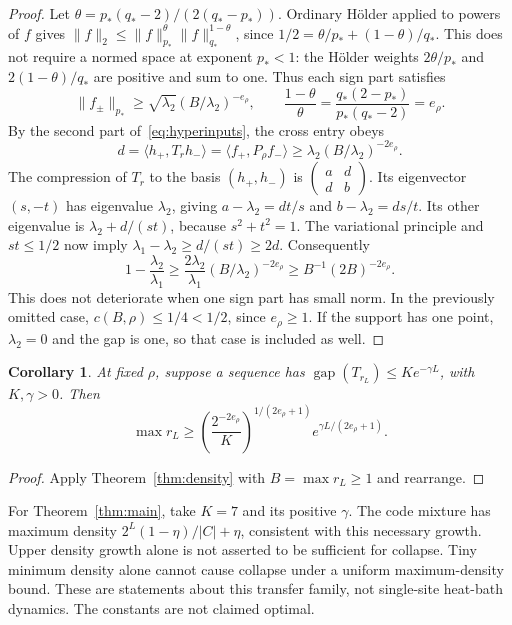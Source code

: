 \documentclass[11pt]{article}
\newtheorem{corollary}[theorem]{Corollary}
\newcommand{\gap}{\operatorname{gap}}
\begin{document}
\begin{proof}
Let $\theta=p_*(q_*-2)/(2(q_*-p_*))$. Ordinary H\"older applied to
powers of $f$ gives
$\|f\|_2\le\|f\|_{p_*}^{\theta}\|f\|_{q_*}^{1-\theta}$,
since $1/2=\theta/p_*+(1-\theta)/q_*$. This does not require a normed
space at exponent $p_*<1$: the H\"older weights
$2\theta/p_*$ and $2(1-\theta)/q_*$ are positive and sum to one.
Thus each sign part satisfies
\[
 \|f_\pm\|_{p_*}\ge\sqrt{\lambda_2}
       (B/\lambda_2)^{-e_\rho},\qquad
 \frac{1-\theta}{\theta}
 =\frac{q_*(2-p_*)}{p_*(q_*-2)}=e_\rho.
\]
By the second part of~\eqref{eq:hyperinputs}, the cross entry obeys
\[
 d=\langle h_+,T_rh_-\rangle
   =\langle f_+,P_\rho f_-\rangle
   \ge\lambda_2(B/\lambda_2)^{-2e_\rho}.
\]
The compression of $T_r$ to the basis $(h_+,h_-)$ is
$\left(\begin{smallmatrix}a&d\\d&b\end{smallmatrix}\right)$.
Its eigenvector $(s,-t)$ has eigenvalue $\lambda_2$, giving
$a-\lambda_2=dt/s$ and $b-\lambda_2=ds/t$.
Its other eigenvalue is $\lambda_2+d/(st)$, because $s^2+t^2=1$.
The variational principle and $st\le1/2$ now imply
$\lambda_1-\lambda_2\ge d/(st)\ge2d$. Consequently
\[
 1-\frac{\lambda_2}{\lambda_1}
 \ge\frac{2\lambda_2}{\lambda_1}(B/\lambda_2)^{-2e_\rho}
 \ge B^{-1}(2B)^{-2e_\rho}.
\]
This does not deteriorate when one sign part has small norm. In the
previously omitted case, $c(B,\rho)\le1/4<1/2$, since $e_\rho\ge1$.
If the support has one point, $\lambda_2=0$ and the gap is one, so that
case is included as well.
\end{proof}

\begin{corollary}\label{cor:densitygrowth}
At fixed $\rho$, suppose a sequence has
$\gap(T_{r_L})\le K e^{-\gamma L}$, with $K,\gamma>0$. Then
\[
 \max r_L\ge
 \left(\frac{2^{-2e_\rho}}K\right)^{1/(2e_\rho+1)}
       e^{\gamma L/(2e_\rho+1)}.
\]
\end{corollary}
\begin{proof}
Apply Theorem~\ref{thm:density} with $B=\max r_L\ge1$ and rearrange.
\end{proof}
For Theorem~\ref{thm:main}, take $K=7$ and its positive $\gamma$.
The code mixture has maximum density $2^L(1-\eta)/|C|+\eta$, consistent
with this necessary growth. Upper density growth alone is not asserted
to be sufficient for collapse. Tiny minimum density alone cannot cause
collapse under a uniform maximum-density bound. These are statements
about this transfer family, not single-site heat-bath dynamics.
The constants are not claimed optimal.
\end{document}
